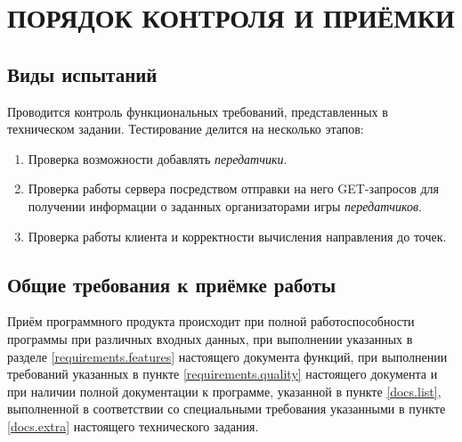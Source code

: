 \section{ПОРЯДОК КОНТРОЛЯ И ПРИЁМКИ}

\subsection{Виды испытаний}
Проводится контроль функциональных требований, представленных в техническом
задании.
Тестирование делится на несколько этапов:
\begin{enumerate}
	\item Проверка возможности добавлять \emph{передатчики}.
	\item Проверка работы сервера посредством отправки на него GET-запросов для получении
	информации о заданных организаторами игры \emph{передатчиков}.
	\item Проверка работы клиента и корректности вычисления направления до точек.
\end{enumerate}

\subsection{Общие требования к приёмке работы}
Приём программного продукта происходит при полной работоспособности программы при
различных входных данных, при выполнении указанных в разделе \ref{requirements.features} настоящего документа
функций, при выполнении требований указанных в пункте \ref{requirements.quality} настоящего документа и при
наличии полной документации к программе, указанной в пункте \ref{docs.list}, выполненной в соответствии
со специальными требования указанными в пункте \ref{docs.extra} настоящего технического задания.

\clearpage